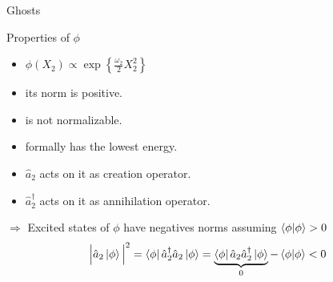 \begin{frame}{Ghosts}
  \begin{alertblock}{Properties of $\phi$}
    \begin{itemize}
      \item $\phi(X_2) \propto \exp \left\{ \frac{\omega_2}{2} X_2^2\right\}$
      \item its norm is positive.
      \item is not normalizable.
      \item formally has the lowest energy.
      \item $\hat{a}_2$ acts on it as creation operator.
      \item $\hat{a}_2^{\dagger}$ acts on it as annihilation operator.
    \end{itemize}
  \end{alertblock}

  $\Rightarrow$ Excited states of $\phi$ have negatives norms assuming
  $\bra{\phi} \ket{\phi} > 0$
  \begin{equation*}
    {\Big| \hat{a}_2 \ket{\phi} \Big|}^2 =
    \bra{\phi} \hat{a}_2^{\dagger} \hat{a}_2 \ket{\phi} =
    \underbrace{
      \bra{\phi} \hat{a}_2 \hat{a}_2^{\dagger} \ket{\phi}
    }_{0} - \bra{\phi} \ket{\phi} < 0
  \end{equation*}
\end{frame}
